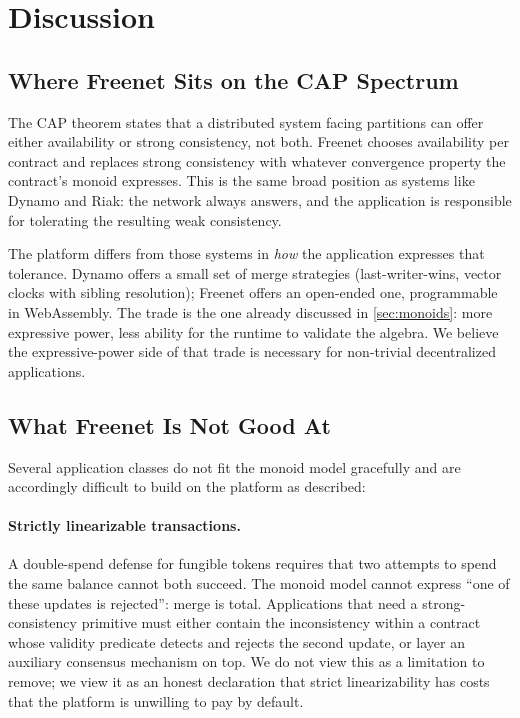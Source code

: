 \section{Discussion}
\label{sec:discussion}

\subsection{Where Freenet Sits on the CAP Spectrum}

The CAP theorem \citep{brewer2000towards,gilbert2002cap} states that a distributed system facing partitions can offer either availability or strong consistency, not both. Freenet chooses availability per contract and replaces strong consistency with whatever convergence property the contract's monoid expresses. This is the same broad position as systems like Dynamo \citep{decandia2007dynamo} and Riak: the network always answers, and the application is responsible for tolerating the resulting weak consistency.

The platform differs from those systems in \emph{how} the application expresses that tolerance. Dynamo offers a small set of merge strategies (last-writer-wins, vector clocks with sibling resolution); Freenet offers an open-ended one, programmable in WebAssembly. The trade is the one already discussed in \cref{sec:monoids}: more expressive power, less ability for the runtime to validate the algebra. We believe the expressive-power side of that trade is necessary for non-trivial decentralized applications.

\subsection{What Freenet Is Not Good At}

Several application classes do not fit the monoid model gracefully and are accordingly difficult to build on the platform as described:

\paragraph{Strictly linearizable transactions.} A double-spend defense for fungible tokens requires that two attempts to spend the same balance cannot both succeed. The monoid model cannot express ``one of these updates is rejected'': merge is total. Applications that need a strong-consistency primitive must either contain the inconsistency within a contract whose validity predicate detects and rejects the second update, or layer an auxiliary consensus mechanism on top. We do not view this as a limitation to remove; we view it as an honest declaration that strict linearizability has costs that the platform is unwilling to pay by default.

